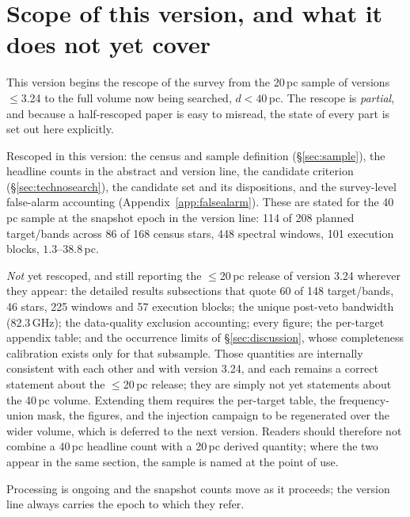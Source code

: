 \documentclass{openjournal}
\begin{document}

\section*{Scope of this version, and what it does not yet cover}

This version begins the rescope of the survey from the 20\,pc sample of
versions $\le$3.24 to the full volume now being searched, $d<40$\,pc.
The rescope is \emph{partial}, and because a half-rescoped paper is
easy to misread, the state of every part is set out here explicitly.

Rescoped in this version: the census and sample definition
(\S\ref{sec:sample}), the headline counts in the abstract and version
line, the candidate criterion (\S\ref{sec:technosearch}), the
candidate set and its dispositions, and the survey-level false-alarm
accounting (Appendix~\ref{app:falsealarm}). These are stated for the
40\,pc sample at the snapshot epoch in the version line: 114 of 208
planned target/bands across 86 of 168 census stars, 448 spectral
windows, 101 execution blocks, $1.3$--$38.8$\,pc.

\emph{Not} yet rescoped, and still reporting the $\le$20\,pc release of
version 3.24 wherever they appear: the detailed results subsections
that quote 60 of 148 target/bands, 46 stars, 225 windows and 57
execution blocks; the unique post-veto bandwidth (82.3\,GHz); the
data-quality exclusion accounting; every figure; the per-target
appendix table; and the occurrence limits of
\S\ref{sec:discussion}, whose completeness calibration exists only for
that subsample. Those quantities are internally consistent with each
other and with version 3.24, and each remains a correct statement
about the $\le$20\,pc release; they are simply not yet statements about
the 40\,pc volume. Extending them requires the per-target table, the
frequency-union mask, the figures, and the injection campaign to be
regenerated over the wider volume, which is deferred to the next
version. Readers should therefore not combine a 40\,pc headline count
with a 20\,pc derived quantity; where the two appear in the same
section, the sample is named at the point of use.

Processing is ongoing and the snapshot counts move as it proceeds;
the version line always carries the epoch to which they refer.
\end{document}
